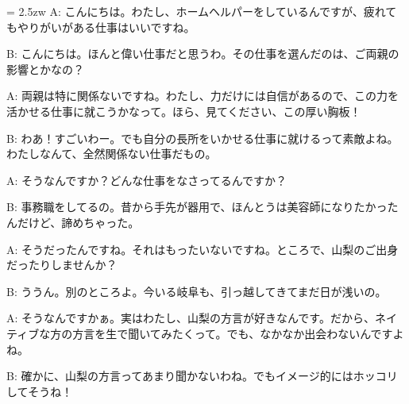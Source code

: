\documentclass[11pt]{amsart}
\title{}
\author{}
\newenvironment{hangall}[1]{\hangindent = 2.5zw\everypar{\hangindent = 2.5zw}}{}
\begin{document}
\maketitle
\begin{hangall}{}%
A: こんにちは。わたし、ホームヘルパーをしているんですが、疲れてもやりがいがある仕事はいいですね。

B: こんにちは。ほんと偉い仕事だと思うわ。その仕事を選んだのは、ご両親の影響とかなの？

A: 両親は特に関係ないですね。わたし、力だけには自信があるので、この力を活かせる仕事に就こうかなって。ほら、見てください、この厚い胸板！

B: わあ！すごいわー。でも自分の長所をいかせる仕事に就けるって素敵よね。わたしなんて、全然関係ない仕事だもの。

A: そうなんですか？どんな仕事をなさってるんですか？

B: 事務職をしてるの。昔から手先が器用で、ほんとうは美容師になりたかったんだけど、諦めちゃった。

A: そうだったんですね。それはもったいないですね。ところで、山梨のご出身だったりしませんか？

B: ううん。別のところよ。今いる岐阜も、引っ越してきてまだ日が浅いの。

A: そうなんですかぁ。実はわたし、山梨の方言が好きなんです。だから、ネイティブな方の方言を生で聞いてみたくって。でも、なかなか出会わないんですよね。

B: 確かに、山梨の方言ってあまり聞かないわね。でもイメージ的にはホッコリしてそうね！
\end{hangall}
\end{document}
